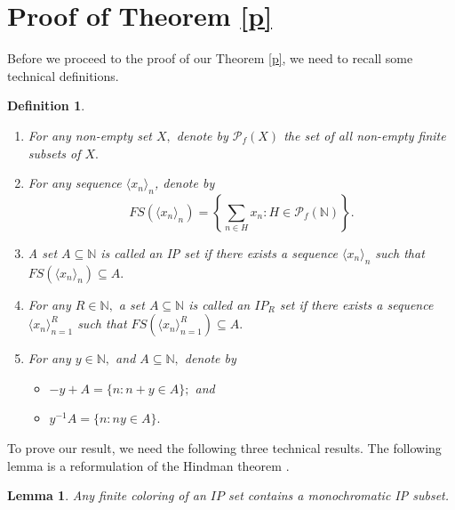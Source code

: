 \documentclass{aic}
\newtheorem{lem}{Lemma}
\newtheorem{defn}{Definition}
\newcommand{\N}{\mathbb{N}}
\begin{document}

\section{Proof of Theorem \ref{p}}

Before we proceed to the proof of our Theorem \ref{p}, we need to recall some technical definitions.

\begin{defn}\text{}
    \begin{enumerate}
        \item For any non-empty set $X,$ denote by $\mathcal{P}_f(X)$ the set of all non-empty finite subsets of $X.$
        \item For any sequence $\langle x_n\rangle_n$, denote by $$FS\left(\langle x_n\rangle_n\right)=\left\lbrace \sum_{n\in H}x_n:H\in \mathcal{P}_f(\N) \right\rbrace.$$

        \item A set $A\subseteq \N$ is called an IP set if there exists a sequence $\langle x_n\rangle_n$ such that $FS\left(\langle x_n\rangle_n\right)\subseteq A.$

         \item For any $R\in \N,$ a set $A\subseteq \N$ is called an $IP_R$ set if there exists a sequence $\langle x_n\rangle_{n=1}^R$ such that $FS\left(\langle x_n\rangle_{n=1}^R\right)\subseteq A.$

         \item For any $y\in \N,$ and $A\subseteq \N,$ denote by 

                       \begin{itemize}
                           \item $-y+A=\{n: n+y\in A\};$ and
                           \item $y^{-1}A=\{n: ny\in A\}.$
                       \end{itemize}
    \end{enumerate}
\end{defn}

To prove our result, we need the following three technical results.
The following lemma is a reformulation of the Hindman theorem \cite{finitesum}.
\begin{lem}\textup{\cite[Lemma 5.19.2.]{hs}}\label{1}
    Any finite coloring of an $IP$ set contains a monochromatic IP subset. 
\end{lem}
\end{document}
